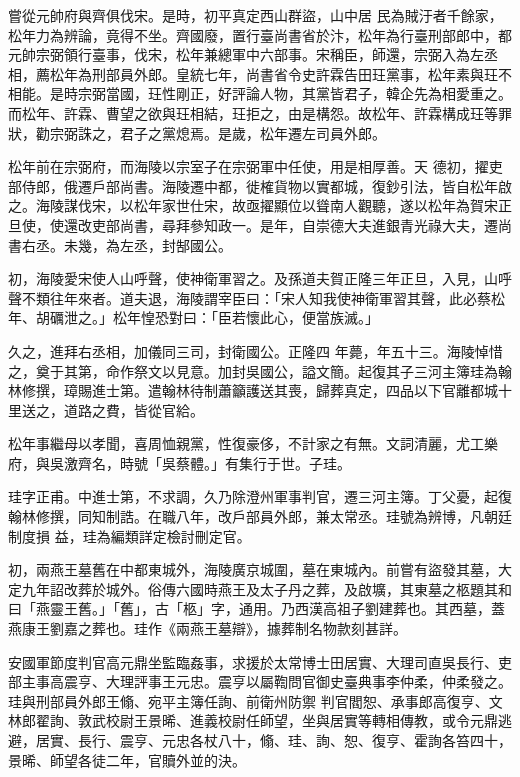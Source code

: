 \begin{pinyinscope}
 嘗從元帥府與齊俱伐宋。是時，初平真定西山群盜，山中居
 民為賊汙者千餘家，松年力為辨論，竟得不坐。齊國廢，置行臺尚書省於汴，松年為行臺刑部郎中，都元帥宗弼領行臺事，伐宋，松年兼總軍中六部事。宋稱臣，師還，宗弼入為左丞相，薦松年為刑部員外郎。皇統七年，尚書省令史許霖告田玨黨事，松年素與玨不相能。是時宗弼當國，玨性剛正，好評論人物，其黨皆君子，韓企先為相愛重之。而松年、許霖、曹望之欲與玨相結，玨拒之，由是構怨。故松年、許霖構成玨等罪狀，勸宗弼誅之，君子之黨熄焉。是歲，松年遷左司員外郎。



 松年前在宗弼府，而海陵以宗室子在宗弼軍中任使，用是相厚善。天
 德初，擢吏部侍郎，俄遷戶部尚書。海陵遷中都，徙榷貨物以實都城，復鈔引法，皆自松年啟之。海陵謀伐宋，以松年家世仕宋，故亟擢顯位以聳南人觀聽，遂以松年為賀宋正旦使，使還改吏部尚書，尋拜參知政一。是年，自崇德大夫進銀青光祿大夫，遷尚書右丞。未幾，為左丞，封郜國公。



 初，海陵愛宋使人山呼聲，使神衛軍習之。及孫道夫賀正隆三年正旦，入見，山呼聲不類往年來者。道夫退，海陵謂宰臣曰：「宋人知我使神衛軍習其聲，此必蔡松年、胡礪泄之。」松年惶恐對曰：「臣若懷此心，便當族滅。」



 久之，進拜右丞相，加儀同三司，封衛國公。正隆四
 年薨，年五十三。海陵悼惜之，奠于其第，命作祭文以見意。加封吳國公，謚文簡。起復其子三河主簿珪為翰林修撰，璋賜進士第。遣翰林待制蕭籲護送其喪，歸葬真定，四品以下官離都城十里送之，道路之費，皆從官給。



 松年事繼母以孝聞，喜周恤親黨，性復豪侈，不計家之有無。文詞清麗，尤工樂府，與吳激齊名，時號「吳蔡體。」有集行于世。子珪。



 珪字正甫。中進士第，不求調，久乃除澄州軍事判官，遷三河主簿。丁父憂，起復翰林修撰，同知制誥。在職八年，改戶部員外郎，兼太常丞。珪號為辨博，凡朝廷制度損
 益，珪為編類詳定檢討刪定官。



 初，兩燕王墓舊在中都東城外，海陵廣京城圍，墓在東城內。前嘗有盜發其墓，大定九年詔改葬於城外。俗傳六國時燕王及太子丹之葬，及啟壙，其東墓之柩題其和曰「燕靈王舊。」「舊」，古「柩」字，通用。乃西漢高祖子劉建葬也。其西墓，蓋燕康王劉嘉之葬也。珪作《兩燕王墓辯》，據葬制名物款刻甚詳。



 安國軍節度判官高元鼎坐監臨姦事，求援於太常博士田居實、大理司直吳長行、吏部主事高震亨、大理評事王元忠。震亨以屬鞫問官御史臺典事李仲柔，仲柔發之。珪與刑部員外郎王翛、宛平主簿任詢、前衛州防禦
 判官閻恕、承事郎高復亨、文林郎翟詢、敦武校尉王景晞、進義校尉任師望，坐與居實等轉相傳教，或令元鼎逃避，居實、長行、震亨、元忠各杖八十，翛、珪、詢、恕、復亨、霍詢各笞四十，景晞、師望各徒二年，官贖外並的決。




\end{pinyinscope}
